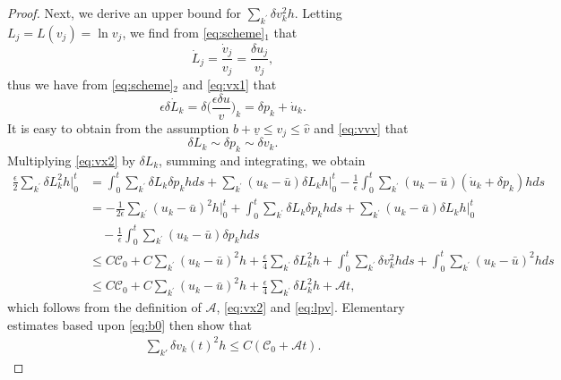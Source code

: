 \documentclass[a4paper,oneside,11pt]{article}
\numberwithin{equation}{section}
\begin{document}
\begin{proof}
Next, we derive an upper bound for \(\sum\limits_{k^{\prime}}\delta v_{k}^{2}h\).
Letting \(L_j=L(v_j)=\ln v_j\), we find from \eqref{eq:scheme}$_1$ that
\begin{equation}\label{eq:vx1}
  \dot{L}_{j}=\frac{\dot v_{j}}{v_{j}}=\frac{\delta u_{j}}{v_{j}},
\end{equation}
thus we have from \eqref{eq:scheme}$_2$ and \eqref{eq:vx1} that
\begin{equation}\label{eq:vx2}
  \epsilon\delta\dot{L}_{k}=\delta\Big(\frac{\epsilon\delta u}{v}\Big)_{k}=\delta p_k+\dot{u}_k.
\end{equation}
It is easy to obtain from the assumption $b+\underline{v}\leq v_j\leq \hat{v}$ and \eqref{eq:vvv} that
\begin{equation}\label{eq:lpv}
	\delta L_k\sim\delta p_{k}\sim\delta v_{k}.
\end{equation}
Multiplying \eqref{eq:vx2} by \(\delta L_{k}\), summing and integrating, we obtain
\begin{equation*}
\begin{aligned}\frac\epsilon2\sum_{k^{\prime}}\delta L_{k}^{2}h\Big|_{0}^{t}&=\int_{0}^{t}\sum_{k^{'}}\delta L_{k}\delta p_{k}hds+\sum_{k^{'}}(u_k-\bar u)\delta L_{k}h\Big|_{0}^{t}%
-\frac1\epsilon\int_{0}^{t}\sum_{k^{'}} (u_k-\bar u)(\dot{u}_{k}+\delta p_{k})hds\\&
=-\frac1{2\epsilon}\sum_{k^{\prime}} (u_k-\bar u)^{2}h\Big|_{0}^{t}+\int_{0}^{t}\sum_{k^{'}}\delta L_{k}\delta p_{k}hds+\sum_{k^{'}}(u_k-\bar u)\delta L_{k}h\Big|_{0}^{t}\\&\quad
-\frac1\epsilon\int_{0}^{t}\sum_{k^{'}} (u_k-\bar u)\delta p_{k}hds\\
&\leq C\mathscr{C}_{0}+C\sum_{k^{\prime}} (u_k-\bar u)^{2}h+\frac\epsilon4\sum_{k^{\prime}}\!\delta L_{k}^{2}h+\int_{0}^{t}\!\sum_{k^{'}}\!\delta v_{k}^{2}hds+\int_{0}^{t}\!\sum_{k^{'}}(u_{k}\!-\!\bar u)^{2}hds\\
&\leq C\mathscr{C}_{0}+C\sum_{k^{\prime}} (u_k-\bar u)^{2}h+\frac\epsilon4\sum_{k^{\prime}}\!\delta L_{k}^{2}h+\mathscr{A}t,\end{aligned}  
\end{equation*}
which follows from the definition of $\mathscr{A}$, \eqref{eq:vx2} and \eqref{eq:lpv}. Elementary estimates based upon \eqref{eq:b0} then show that
\begin{equation}\label{eq:vx0}
\begin{aligned}\sum_{k'}\delta v_{k}(t)^{2}h\leq C(\mathscr{C}_{0}+\mathscr{A}t).\end{aligned}  

\end{equation}
\end{proof}
\end{document}
